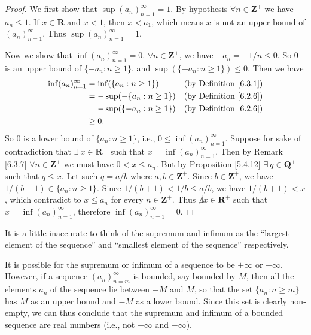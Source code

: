 \begin{proof}
    We first show that \(\sup(a_n)_{n = 1}^\infty = 1\).
    By hypothesis \(\forall n \in \mathbf{Z}^+\) we have \(a_n \leq 1\).
    If \(x \in \mathbf{R}\) and \(x < 1\), then \(x < a_1\), which means \(x\) is not an upper bound of \((a_n)_{n = 1}^\infty\).
    Thus \(\sup(a_n)_{n = 1}^\infty = 1\).

    Now we show that \(\inf(a_n)_{n = 1}^\infty = 0\).
    \(\forall n \in \mathbf{Z}^+\), we have \(-a_n = -1 / n \leq 0\).
    So \(0\) is an upper bound of \(\{-a_n : n \geq 1\}\), and \(\sup(\{-a_n : n \geq 1\}) \leq 0\).
    Then we have
    \begin{align*}
        \inf(a_n)_{n = 1}^\infty & = \inf(\{a_n : n \geq 1\})   & \text{(by Definition \ref{6.3.1})} \\
                                 & = -\sup(-\{a_n : n \geq 1\}) & \text{(by Definition \ref{6.2.6})} \\
                                 & = -\sup(\{-a_n : n \geq 1\}) & \text{(by Definition \ref{6.2.6})} \\
                                 & \geq 0.
    \end{align*}
    So \(0\) is a lower bound of \(\{a_n : n \geq 1\}\), i.e., \(0 \leq \inf(a_n)_{n = 1}^\infty\).
    Suppose for sake of contradiction that \(\exists\ x \in \mathbf{R}^+\) such that \(x = \inf(a_n)_{n = 1}^\infty\).
    Then by Remark \ref{6.3.7} \(\forall n \in \mathbf{Z}^+\) we must have \(0 < x \leq a_n\).
    But by Proposition \ref{5.4.12} \(\exists\ q \in \mathbf{Q}^+\) such that \(q \leq x\).
    Let such \(q = a / b\) where \(a, b \in \mathbf{Z}^+\).
    Since \(b \in \mathbf{Z}^+\), we have \(1 / (b + 1) \in \{a_n : n \geq 1\}\).
    Since \(1 / (b + 1) < 1 / b \leq a / b\), we have \(1 / (b + 1) < x\), which contradict to \(x \leq a_n\) for every \(n \in \mathbf{Z}^+\).
    Thus \(\nexists x \in \mathbf{R}^+\) such that \(x = \inf(a_n)_{n = 1}^\infty\), therefore \(\inf(a_n)_{n = 1}^\infty = 0\).
\end{proof}

\begin{note}
    It is a little inaccurate to think of the supremum and infimum as the ``largest element of the sequence'' and ``smallest element of the sequence'' respectively.
\end{note}

\begin{note}
    It is possible for the supremum or infimum of a sequence to be \(+\infty\) or \(-\infty\).
    However, if a sequence \((a_n)_{n = m}^\infty\) is bounded, say bounded by \(M\), then all the elements \(a_n\) of the sequence lie between \(-M\) and \(M\), so that the set \(\{a_n : n \geq m\}\) has \(M\) as an upper bound and \(-M\) as a lower bound.
    Since this set is clearly non-empty, we can thus conclude that the supremum and infimum of a bounded sequence are real numbers (i.e., not \(+\infty\) and \(-\infty\)).
\end{note}

